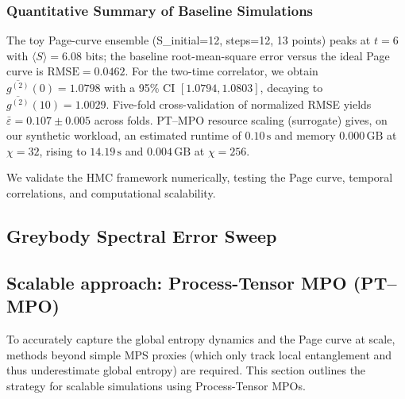 \documentclass[aps,prd,preprint,onecolumn,superscriptaddress,nofootinbib,longbibliography,floatfix,11pt,showpacs,showkeys]{revtex4-2}
\newcommand{\HMC}{\textsc{HMC}\xspace}
\theoremstyle{plain}
\theoremstyle{definition}
\theoremstyle{remark}
\providecommand{\valPageRMSE}{0.0462}
\providecommand{\valCVMean}{0.107}
\providecommand{\valCVStd}{0.005}
\providecommand{\valRuntimeLow}{0.10}
\providecommand{\valMemLow}{0.000}
\providecommand{\valRuntimeHigh}{14.19}
\providecommand{\valMemHigh}{0.004}
\begin{document}
\subsubsection{Quantitative Summary of Baseline Simulations}
The toy Page-curve ensemble (S\_initial=12, steps=12, 13 points) peaks at $t=6$ with $\langle S\rangle=6.08$ bits;
the baseline root-mean-square error versus the ideal Page curve is $\mathrm{RMSE}=\valPageRMSE$.
For the two-time correlator, we obtain $\overline{g^{(2)}}(0)=1.0798$ with a 95\% CI $[1.0794,1.0803]$, decaying to
$\overline{g^{(2)}}(10)=1.0029$.
Five-fold cross-validation of normalized RMSE yields
$\bar{\varepsilon}=\valCVMean \pm \valCVStd$ across folds.
PT--MPO resource scaling (surrogate) gives, on our synthetic workload, an estimated runtime of $\valRuntimeLow\,\mathrm{s}$ and
memory $\valMemLow\,\mathrm{GB}$ at $\chi=32$, rising to $\valRuntimeHigh\,\mathrm{s}$ and $\valMemHigh\,\mathrm{GB}$ at $\chi=256$.

We validate the \HMC{} framework numerically, testing the Page curve, temporal correlations, and computational scalability.

% 
\subsection{Greybody Spectral Error Sweep}
\label{sec:greybody-sweep}

\subsection{Scalable approach: Process-Tensor MPO (PT--MPO)}

\label{ssec:ptmpo}
To accurately capture the global entropy dynamics and the Page curve at scale, methods beyond simple MPS proxies (which only track local entanglement and thus underestimate global entropy) are required.
This section outlines the strategy for scalable simulations using Process-Tensor MPOs.
\end{document}
